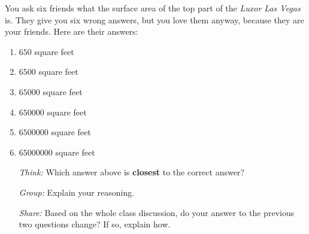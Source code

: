 \documentclass[handout,nooutcomes,noauthor,hints]{ximera}
\begin{document}
\mynewpage

 \begin{question} %
%
    You ask six friends what the surface area of the top part of the
    \textit{Luxor Las Vegas} is. They give you six wrong answers, but
    you love them anyway, because they are your friends. Here are
    their answers:
    \begin{enumerate}
    \item $650$ square feet
    \item $6500$ square feet
    \item $65000$ square feet
    \item $650000$ square feet
    \item $6500000$ square feet
    \item $65000000$ square feet
    \end{enumerate}
      \begin{enumerate}
  \item[ \emph{Think:}] Which answer above is \textbf{closest} to the correct answer? 
  \item[\emph{Group:}]Explain your reasoning.
      \item[\emph{Share:}] Based on the whole class discussion, do your answer to the previous two questions change?  If so, explain how.
        \end{enumerate}

  \end{question}

\mynewpage
\end{document}
